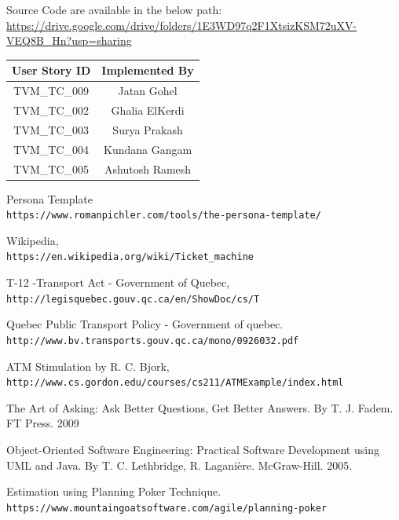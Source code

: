 \documentclass[12pt]{report}
\begin{document}
Source Code are available in the below path:
\url{https://drive.google.com/drive/folders/1E3WD97q2F1XtsizKSM72uXV-VEQ8B_Hn?usp=sharing}

\begin{table}[h]
\centering
\begin{tabular}{|c|c|}
\hline
\textbf{User Story ID} & \textbf{Implemented By} \\ \hline
TVM\_TC\_009           & Jatan Gohel             \\ \hline
TVM\_TC\_002           & Ghalia ElKerdi          \\ \hline
TVM\_TC\_003           & Surya Prakash           \\ \hline
TVM\_TC\_004           & Kundana Gangam          \\ \hline
TVM\_TC\_005           & Ashutosh Ramesh         \\ \hline
\end{tabular}
\end{table}

\begin{thebibliography}{9}


Persona Template
\\\texttt{https://www.romanpichler.com/tools/the-persona-template/}

Wikipedia,
\\\texttt{https://en.wikipedia.org/wiki/Ticket\_machine}

\bibitem{} 
T-12 -Transport Act - Government of Quebec,
\\\texttt{http://legisquebec.gouv.qc.ca/en/ShowDoc/cs/T}

\bibitem{} 
Quebec Public Transport Policy - Government of quebec.
\\\texttt{http://www.bv.transports.gouv.qc.ca/mono/0926032.pdf}


ATM Stimulation by R. C. Bjork,
\\\texttt{http://www.cs.gordon.edu/courses/cs211/ATMExample/index.html}

The Art of Asking: Ask Better Questions, 
Get Better Answers. By T. J. Fadem. FT Press. 2009
\\\texttt{}

Object-Oriented Software Engineering: Practical Software Development using UML and Java. By T. C. Lethbridge, R. Laganière. McGraw-Hill. 2005.
\\\texttt{}

Estimation using Planning Poker Technique.
\\\texttt{https://www.mountaingoatsoftware.com/agile/planning-poker}



\end{thebibliography}
\end{document}
